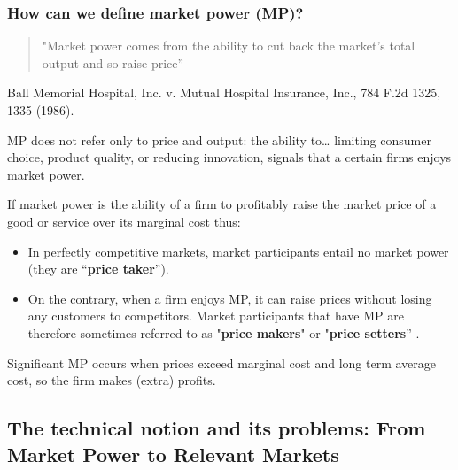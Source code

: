         \subsubsection{How can we define market power (MP)?}

            \begin{quote}
                 "Market power comes from the ability to cut back the market's total output and so raise price”
            \end{quote}
            Ball Memorial Hospital, Inc. v. Mutual Hospital Insurance, Inc., 784 F.2d 1325, 1335 (1986).


            MP does not refer only to price and output: the ability to… limiting consumer choice, product quality, or reducing innovation, signals that a certain firms enjoys market power.

            If market power is the ability of a firm to profitably raise the market price of a good or service over its marginal cost thus:
            \begin{itemize}
                \item In perfectly competitive markets, market participants entail no market power (they are “\textbf{price taker}”).
                \item On the contrary, when a firm enjoys MP, it can raise prices without losing any customers to competitors. Market participants that have MP are therefore sometimes referred to as "\textbf{price makers}" or "\textbf{price setters}” .
            \end{itemize}
            Significant MP occurs when prices exceed marginal cost and long term average cost, so the firm makes (extra) profits.

    \subsection{The technical notion and its problems: From Market Power to Relevant Markets}


